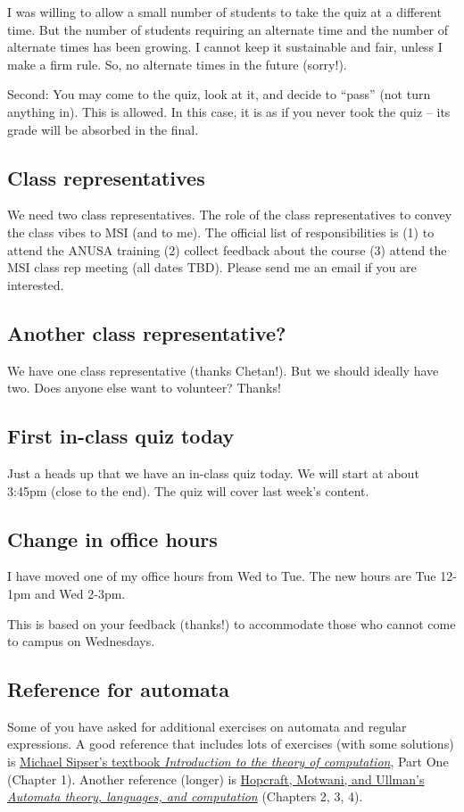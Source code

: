 \documentclass{amsart}
\begin{document}
I was willing to allow a small number of students to take the quiz at a different time.  But the number of students requiring an alternate time and the number of alternate times has been growing.  I cannot keep it sustainable and fair, unless I make a firm rule.  So, no alternate times in the future (sorry!).

Second: You may come to the quiz, look at it, and decide to ``pass'' (not turn anything in).  This is allowed.  In this case, it is as if you never took the quiz -- its grade will be absorbed in the final.
\subsection{Class representatives}
\label{sec:org5ac833e}
We need two class representatives.  The role of the class representatives to convey the class vibes to MSI (and to me).  The official list of responsibilities is (1) to attend the ANUSA training (2) collect feedback about the course (3) attend the MSI class rep meeting (all dates TBD).  Please send me an email if you are interested.
\subsection{Another class representative?}
\label{sec:orgc468ada}
We have one class representative (thanks Chetan!).  But we should ideally have two.  Does anyone else want to volunteer?  Thanks!
\subsection{First in-class quiz today}
\label{sec:orge07fbea}
Just a heads up that we have an in-class quiz today.  We will start at about 3:45pm (close to the end).  The quiz will cover last week's content.
\subsection{Change in office hours}
\label{sec:orga6599e8}
I have moved one of my office hours from Wed to Tue.  The new hours are Tue 12-1pm and Wed 2-3pm.

This is based on your feedback (thanks!) to accommodate those who cannot come to campus on Wednesdays. 
\subsection{Reference for automata}
\label{sec:org61ca37f}
Some of you have asked for additional exercises on automata and regular expressions.
A good reference that includes lots of exercises (with some solutions) is \href{http://debracollege.dspaces.org/bitstream/123456789/671/1/Introduction\%20to\%20the\%20Theory\%20of\%20Computation\_2013\%20Sipser.pdf}{Michael Sipser's textbook \emph{Introduction to the theory of computation}}, Part One (Chapter 1).
Another reference (longer) is \href{https://dpvipracollege.ac.in/wp-content/uploads/2023/01/John-E.-Hopcroft-Rajeev-Motwani-Jeffrey-D.-Ullman-Introduction-to-Automata-Theory-Languages-and-Computations-Prentice-Hall-2006.pdf}{Hopcraft, Motwani, and Ullman's \emph{Automata theory, languages, and computation}} (Chapters 2, 3, 4).
\end{document}
